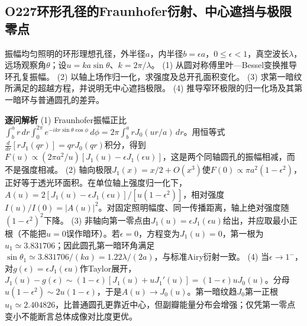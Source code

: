 \subsection*{O227\quad 环形孔径的Fraunhofer衍射、中心遮挡与极限零点}
振幅均匀照明的环形理想孔径，外半径$a$，内半径$b=\epsilon a$，$0\le\epsilon<1$，真空波长$\lambda$，远场观察角$\theta$；设$u=ka\sin\theta$、$k=2\pi/\lambda$。
(1) 从圆对称傅里叶—Bessel变换推导环孔复振幅。
(2) 以轴上场作归一化，求强度及总开孔面积变化。
(3) 求第一暗纹所满足的超越方程，并说明无中心遮挡极限。
(4) 推导窄环极限的归一化场及其第一暗环与普通圆孔的差异。
\par\textbf{逐问解析}
(1) Fraunhofer振幅正比$\int_b^a r\,dr\int_0^{2\pi}e^{-ikr\sin\theta\cos\phi}\,d\phi=2\pi\int_b^a rJ_0(ur/a)\,dr$。用恒等式$\frac{d}{dr}[rJ_1(qr)]=qrJ_0(qr)$积分，得到$F(u)\propto (2\pi a^2/u)[J_1(u)-\epsilon J_1(\epsilon u)]$，这是两个同轴圆孔的振幅相减，而不是强度相减。
(2) 轴向极限$J_1(x)=x/2+O(x^3)$使$F(0)\propto\pi a^2(1-\epsilon^2)$，正好等于透光环面积。在单位轴上强度归一化下，$A(u)=2[J_1(u)-\epsilon J_1(\epsilon u)]/[u(1-\epsilon^2)]$，相对强度$I(u)/I(0)=|A(u)|^2$。对固定照明幅度、同一传播距离，轴上绝对强度随$(1-\epsilon^2)^2$下降。
(3) 非轴向第一零点由$J_1(u)=\epsilon J_1(\epsilon u)$给出，并应取最小正根（不能把$u=0$误作暗环）。若$\epsilon=0$，方程变为$J_1(u)=0$，第一根为$u_1\simeq3.831706$；因此圆孔第一暗环角满足$\sin\theta_1\simeq3.831706/(ka)=1.22\lambda/(2a)$，与标准Airy衍射一致。
(4) 当$\epsilon\to1^-$，对$g(\epsilon)=\epsilon J_1(\epsilon u)$作Taylor展开，$J_1(u)-g(\epsilon)\sim(1-\epsilon)[J_1(u)+uJ_1'(u)]=(1-\epsilon)uJ_0(u)$。分母$u(1-\epsilon^2)\sim2u(1-\epsilon)$，于是$A(u)\to J_0(u)$。第一暗纹趋$J_0$第一正根$u_1\simeq2.404826$，比普通圆孔更靠近中心，但副瓣能量分布会增强；仅凭第一零点变小不能断言总体成像对比度更优。
\par\medskip
